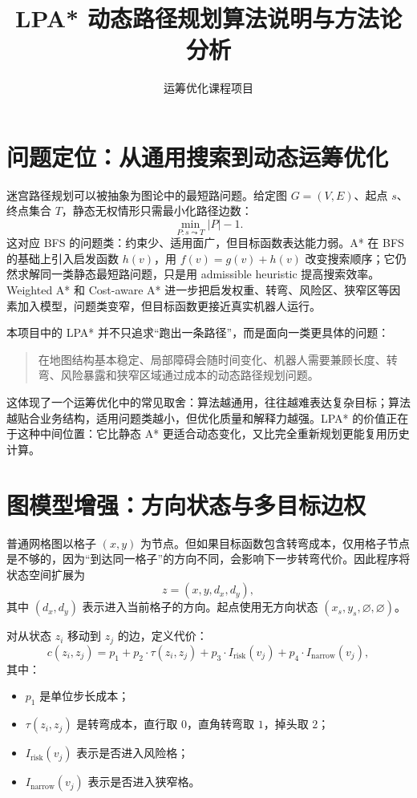 \documentclass[UTF8]{ctexart}
\title{LPA* 动态路径规划算法说明与方法论分析}
\author{运筹优化课程项目}
\date{}
\begin{document}
\maketitle

\section{问题定位：从通用搜索到动态运筹优化}

迷宫路径规划可以被抽象为图论中的最短路问题。给定图
$G=(V,E)$、起点 $s$、终点集合 $T$，静态无权情形只需最小化路径边数：
\[
    \min_{P:s\leadsto T} |P|-1 .
\]
这对应 BFS 的问题类：约束少、适用面广，但目标函数表达能力弱。A* 在 BFS
的基础上引入启发函数 $h(v)$，用 $f(v)=g(v)+h(v)$ 改变搜索顺序；它仍然求解同一类静态最短路问题，只是用 admissible heuristic
提高搜索效率。Weighted A* 和 Cost-aware A* 进一步把启发权重、转弯、风险区、狭窄区等因素加入模型，问题类变窄，但目标函数更接近真实机器人运行。

本项目中的 LPA* 并不只追求“跑出一条路径”，而是面向一类更具体的问题：

\begin{quote}
在地图结构基本稳定、局部障碍会随时间变化、机器人需要兼顾长度、转弯、风险暴露和狭窄区域通过成本的动态路径规划问题。
\end{quote}

这体现了一个运筹优化中的常见取舍：算法越通用，往往越难表达复杂目标；算法越贴合业务结构，适用问题类越小，但优化质量和解释力越强。LPA* 的价值正在于这种中间位置：它比静态 A* 更适合动态变化，又比完全重新规划更能复用历史计算。

\section{图模型增强：方向状态与多目标边权}

普通网格图以格子 $(x,y)$ 为节点。但如果目标函数包含转弯成本，仅用格子节点是不够的，因为“到达同一格子”的方向不同，会影响下一步转弯代价。因此程序将状态空间扩展为
\[
    z=(x,y,d_x,d_y),
\]
其中 $(d_x,d_y)$ 表示进入当前格子的方向。起点使用无方向状态 $(x_s,y_s,\varnothing,\varnothing)$。

对从状态 $z_i$ 移动到 $z_j$ 的边，定义代价：
\[
    c(z_i,z_j)
    =
    p_1
    + p_2 \cdot \tau(z_i,z_j)
    + p_3 \cdot I_{\mathrm{risk}}(v_j)
    + p_4 \cdot I_{\mathrm{narrow}}(v_j),
\]
其中：

\begin{itemize}[leftmargin=2em]
    \item $p_1$ 是单位步长成本；
    \item $\tau(z_i,z_j)$ 是转弯成本，直行取 $0$，直角转弯取 $1$，掉头取 $2$；
    \item $I_{\mathrm{risk}}(v_j)$ 表示是否进入风险格；
    \item $I_{\mathrm{narrow}}(v_j)$ 表示是否进入狭窄格。
\end{itemize}
\end{document}
